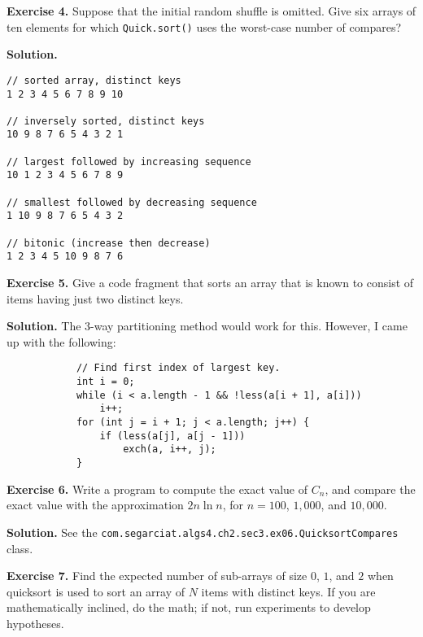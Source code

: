 \documentclass[12pt, a4paper]{article}
\newenvironment{ex}[2][Exercise]
{\par\medskip\noindent \textbf{#1 #2.}}
{\medskip}
\newenvironment{sol}[1][Solution]
{\par\medskip\noindent \textbf{#1.} }
{\medskip}
\begin{document}
	\begin{ex}{4}
		Suppose that the initial random shuffle is omitted. Give six arrays of ten elements
		for which \texttt{Quick.sort()} uses the worst-case number of compares?
	\end{ex}
	\begin{sol}
		\begin{lstlisting}[language={}]
// sorted array, distinct keys
1 2 3 4 5 6 7 8 9 10

// inversely sorted, distinct keys
10 9 8 7 6 5 4 3 2 1

// largest followed by increasing sequence
10 1 2 3 4 5 6 7 8 9

// smallest followed by decreasing sequence
1 10 9 8 7 6 5 4 3 2

// bitonic (increase then decrease)
1 2 3 4 5 10 9 8 7 6

		\end{lstlisting}
	\end{sol}
	\begin{ex}{5}
		Give a code fragment that sorts an array that is known to consist of items having
		just two distinct keys.
	\end{ex}
	\begin{sol}
		The 3-way partitioning method would work for this. However, I came up with
		the following:
		\begin{lstlisting}
			// Find first index of largest key.
			int i = 0;
			while (i < a.length - 1 && !less(a[i + 1], a[i]))
				i++;
			for (int j = i + 1; j < a.length; j++) {
				if (less(a[j], a[j - 1]))
					exch(a, i++, j);
			}
		\end{lstlisting}
	\end{sol}
	\begin{ex}{6}
		Write a program to compute the exact value of $C_n$, and compare the exact value
		with the approximation $2n\ln n$, for $n=100$, $1,000$, and $10,000$.
	\end{ex}
	\begin{sol}
		See the \texttt{com.segarciat.algs4.ch2.sec3.ex06.QuicksortCompares} class.
	\end{sol}
	\begin{ex}{7}
		Find the expected number of sub-arrays of size $0$, $1$, and $2$ when quicksort
		is used to sort an array of $N$ items with distinct keys. If you are mathematically
		inclined, do the math; if not, run experiments to develop hypotheses.
	\end{ex}
\end{document}
